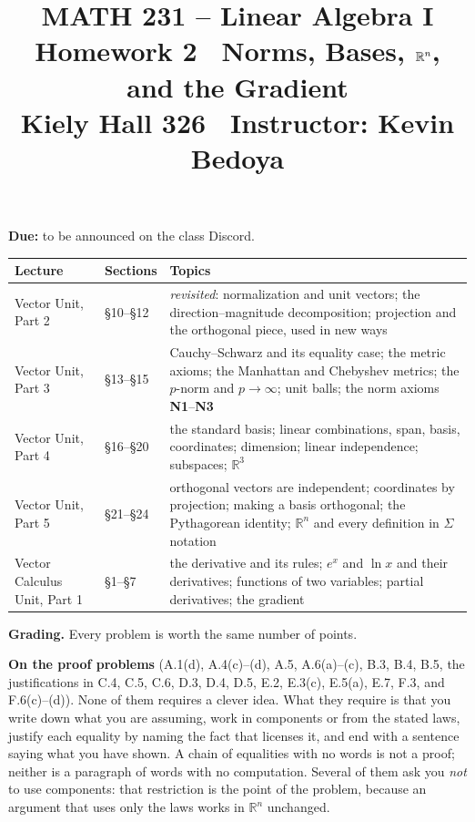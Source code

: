 \documentclass[11pt]{article}
\title{\vspace{-1.2cm}\textbf{\sffamily MATH 231 -- Linear Algebra I}\\[4pt]
       {\large\sffamily Homework 2 \textbullet\ Norms, Bases, $\R^{n}$, and
        the Gradient}\\[2pt]
       {\normalsize\sffamily Kiely Hall 326 \textbullet\
        Instructor: Kevin Bedoya}}
\author{}
\date{}
\newcounter{prob}[section]
\newcommand{\R}{\mathbb{R}}
\newcommand{\duedate}{to be announced on the class Discord}
\begin{document}
\maketitle
\vspace{-1.6cm}

\noindent\textbf{Due:} \duedate.

\medskip
\begin{center}
\renewcommand{\arraystretch}{1.25}
\begin{tabular}{@{}l l >{\raggedright\arraybackslash}p{7.2cm}@{}}
\toprule
\textbf{Lecture} & \textbf{Sections} & \textbf{Topics} \\
\midrule
Vector Unit, Part 2 & \S10--\S12 &
  \emph{revisited}: normalization and unit vectors; the direction--magnitude
  decomposition; projection and the orthogonal piece, used in new ways \\[3pt]
Vector Unit, Part 3 & \S13--\S15 &
  Cauchy--Schwarz and its equality case; the metric axioms; the Manhattan and
  Chebyshev metrics; the $p$-norm and $p\to\infty$; unit balls; the norm
  axioms \textbf{N1}--\textbf{N3} \\[3pt]
Vector Unit, Part 4 & \S16--\S20 &
  the standard basis; linear combinations, span, basis, coordinates;
  dimension; linear independence; subspaces; $\R^{3}$ \\[3pt]
Vector Unit, Part 5 & \S21--\S24 &
  orthogonal vectors are independent; coordinates by projection; making a
  basis orthogonal; the Pythagorean identity; $\R^{n}$ and every definition in
  $\Sigma$ notation \\[3pt]
Vector Calculus Unit, Part 1 & \S1--\S7 &
  the derivative and its rules; $e^{x}$ and $\ln x$ and their derivatives;
  functions of two variables; partial derivatives; the gradient \\
\bottomrule
\end{tabular}
\end{center}

\noindent\textbf{Grading.} Every problem is worth the same number of points.

\medskip
\noindent\textbf{On the proof problems} (A.1(d), A.4(c)--(d), A.5, A.6(a)--(c),
B.3, B.4, B.5, the justifications in C.4, C.5, C.6, D.3, D.4, D.5, E.2, E.3(c),
E.5(a), E.7, F.3, and F.6(c)--(d)). None of them requires a clever idea. What
they require is that you write down what you are assuming, work in components or
from the stated laws, justify each equality by naming the fact that licenses it,
and end with a sentence saying what you have shown. A chain of equalities with
no words is not a proof; neither is a paragraph of words with no computation.
Several of them ask you \emph{not} to use components: that restriction is the
point of the problem, because an argument that uses only the laws works in
$\R^{n}$ unchanged.
\end{document}
